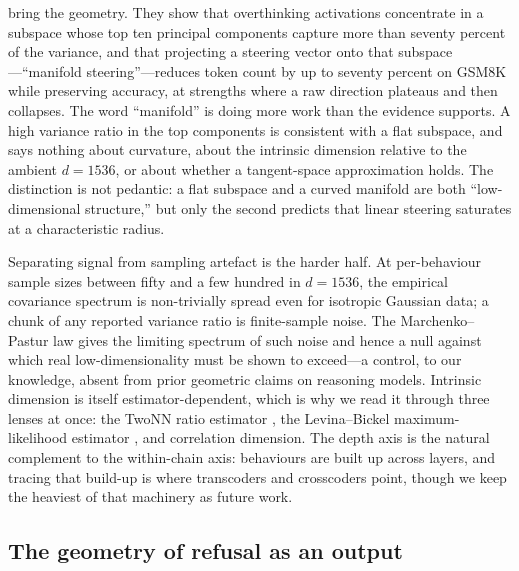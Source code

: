 \documentclass[10pt]{article}
\begin{document}
\citet{huang2025manifold} bring the geometry. They show that overthinking
activations concentrate in a subspace whose top ten principal components capture
more than seventy percent of the variance, and that projecting a steering vector
onto that subspace---``manifold steering''---reduces token count by up to seventy
percent on GSM8K while preserving accuracy, at strengths where a raw direction
plateaus and then collapses. The word ``manifold'' is doing more work than the
evidence supports. A high variance ratio in the top components is consistent with
a flat subspace, and says nothing about curvature, about the intrinsic dimension
relative to the ambient $d=1536$, or about whether a tangent-space approximation
holds. The distinction is not pedantic: a flat subspace and a curved manifold are
both ``low-dimensional structure,'' but only the second predicts that linear
steering saturates at a characteristic radius.

Separating signal from sampling artefact is the harder half. At per-behaviour
sample sizes between fifty and a few hundred in $d=1536$, the empirical covariance
spectrum is non-trivially spread even for isotropic Gaussian data; a chunk of any
reported variance ratio is finite-sample noise. The Marchenko--Pastur law
\citep{marchenko1967distribution} gives the limiting spectrum of such noise and
hence a null against which real low-dimensionality must be shown to exceed---a
control, to our knowledge, absent from prior geometric claims on reasoning models.
Intrinsic dimension is itself estimator-dependent, which is why we read it through
three lenses at once: the TwoNN ratio estimator \citep{facco2017twonn}, the
Levina--Bickel maximum-likelihood estimator \citep{levina2004mle}, and correlation
dimension. The depth axis is the natural complement to the within-chain axis:
behaviours are built up across layers, and tracing that build-up is where
transcoders \citep{dunefsky2024transcoders} and crosscoders
\citep{lindsey2024crosscoders,templeton2024scaling} point, though we keep the
heaviest of that machinery as future work.

\subsection{The geometry of refusal as an output}
\end{document}
